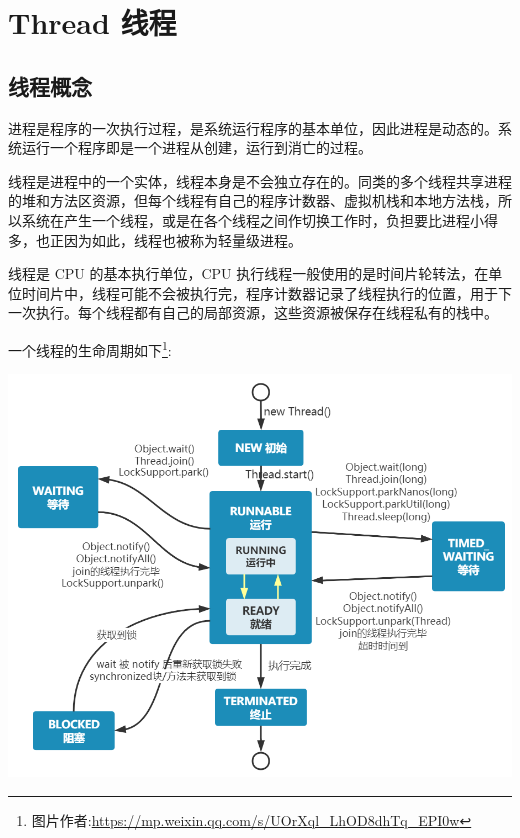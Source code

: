 \section{Thread 线程}
\subsection{线程概念}

进程是程序的一次执行过程，是系统运行程序的基本单位，因此进程是动态的。系统运行一个程序即是一个进程从创建，运行到消亡的过程。

线程是进程中的一个实体，线程本身是不会独立存在的。同类的多个线程共享进程的堆和方法区资源，但每个线程有自己的程序计数器、虚拟机栈和本地方法栈，所以系统在产生一个线程，或是在各个线程之间作切换工作时，负担要比进程小得多，也正因为如此，线程也被称为轻量级进程。

线程是 CPU 的基本执行单位，CPU 执行线程一般使用的是时间片轮转法，在单位时间片中，线程可能不会被执行完，程序计数器记录了线程执行的位置，用于下一次执行。每个线程都有自己的局部资源，这些资源被保存在线程私有的栈中。

一个线程的生命周期如下\footnote{图片作者:\url{https://mp.weixin.qq.com/s/UOrXql_LhOD8dhTq_EPI0w}}:

\begin{center}
    \includegraphics[width=0.8\linewidth]{../../../Images/ThreadProcess.png}
\end{center}

